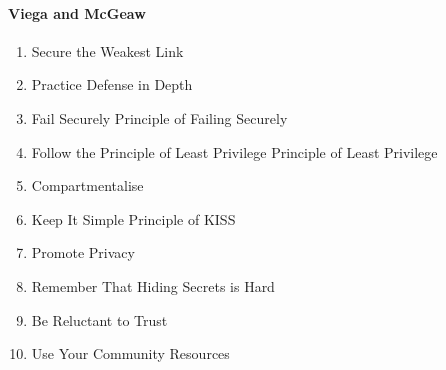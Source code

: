 \paragraph{Viega and McGeaw}
\begin{enumerate}
    \item Secure the Weakest Link
    \item Practice Defense in Depth
    \item Fail Securely \dotfill Principle of Failing Securely
    \item Follow the Principle of Least Privilege \dotfill Principle of Least Privilege
    \item Compartmentalise
    \item Keep It Simple \dotfill Principle of KISS
    \item Promote Privacy
    \item Remember That Hiding Secrets is Hard
    \item Be Reluctant to Trust
    \item Use Your Community Resources
\end{enumerate}
